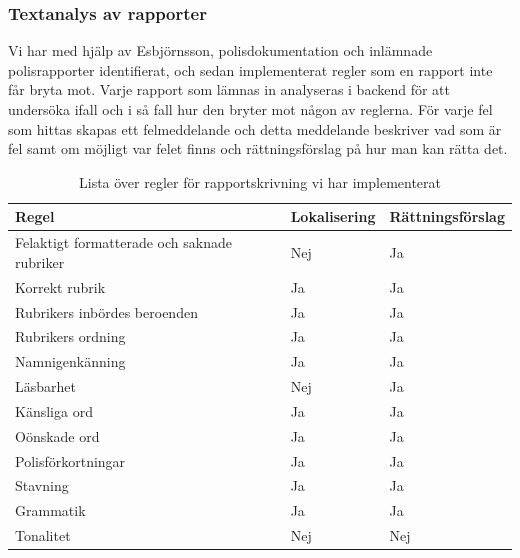 \documentclass[swedish]{maucsthesis}
\begin{document}
\subsubsection{Textanalys av rapporter}

Vi har med hjälp av Esbjörnsson, polisdokumentation och inlämnade polisrapporter identifierat, och sedan implementerat
regler som en rapport inte får bryta mot. Varje rapport som lämnas in analyseras i backend för att undersöka
ifall och i så fall hur den bryter mot någon av reglerna.
För varje fel som hittas skapas ett felmeddelande och detta meddelande beskriver vad som är fel
samt om möjligt var felet finns och rättningsförslag på hur man kan rätta det.

\begin{table}[H]
\centering
\begin{tabular}{|l|l|l|}
\hline
Regel                                       & Lokalisering & Rättningsförslag\\ \hline
Felaktigt formatterade och saknade rubriker & Nej          & Ja               \\ \hline
Korrekt rubrik                              & Ja           & Ja               \\ \hline
Rubrikers inbördes beroenden                 & Ja           & Ja               \\ \hline
Rubrikers ordning                           & Ja           & Ja               \\ \hline
Namnigenkänning                             & Ja           & Ja               \\ \hline
Läsbarhet                                   & Nej          & Ja               \\ \hline
Känsliga ord                                & Ja           & Ja               \\ \hline
Oönskade ord                                & Ja           & Ja               \\ \hline
Polisförkortningar                          & Ja           & Ja               \\ \hline
Stavning                                    & Ja           & Ja               \\ \hline
Grammatik                                   & Ja           & Ja               \\ \hline
Tonalitet                                   & Nej          & Nej              \\ \hline
\end{tabular}
\caption{Lista över regler för rapportskrivning vi har implementerat}
\label{rulestable}
\end{table}
\end{document}
